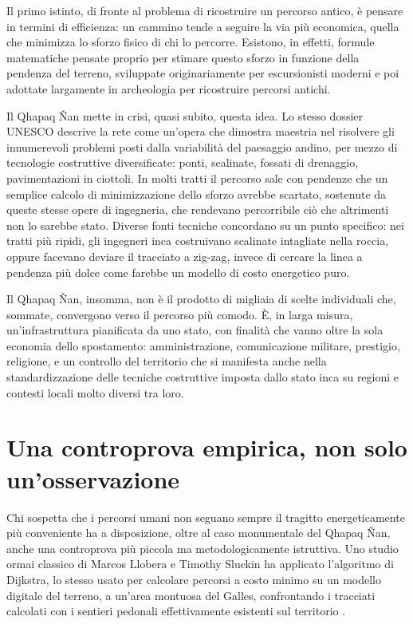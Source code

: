 Il primo istinto, di fronte al problema di ricostruire un percorso antico, è pensare in termini di efficienza: un cammino tende a seguire la via più economica, quella che minimizza lo sforzo fisico di chi lo percorre. Esistono, in effetti, formule matematiche pensate proprio per stimare questo sforzo in funzione della pendenza del terreno, sviluppate originariamente per escursionisti moderni e poi adottate largamente in archeologia per ricostruire percorsi antichi.

Il Qhapaq Ñan mette in crisi, quasi subito, questa idea. Lo stesso dossier UNESCO descrive la rete come un'opera che dimostra maestria nel risolvere gli innumerevoli problemi posti dalla variabilità del paesaggio andino, per mezzo di tecnologie costruttive diversificate: ponti, scalinate, fossati di drenaggio, pavimentazioni in ciottoli. In molti tratti il percorso sale con pendenze che un semplice calcolo di minimizzazione dello sforzo avrebbe scartato, sostenute da queste stesse opere di ingegneria, che rendevano percorribile ciò che altrimenti non lo sarebbe stato. Diverse fonti tecniche concordano su un punto specifico: nei tratti più ripidi, gli ingegneri inca costruivano scalinate intagliate nella roccia, oppure facevano deviare il tracciato a zig-zag, invece di cercare la linea a pendenza più dolce come farebbe un modello di costo energetico puro.

Il Qhapaq Ñan, insomma, non è il prodotto di migliaia di scelte individuali che, sommate, convergono verso il percorso più comodo. È, in larga misura, un'infrastruttura pianificata da uno stato, con finalità che vanno oltre la sola economia dello spostamento: amministrazione, comunicazione militare, prestigio, religione, e un controllo del territorio che si manifesta anche nella standardizzazione delle tecniche costruttive imposta dallo stato inca su regioni e contesti locali molto diversi tra loro.

\section{Una controprova empirica, non solo un'osservazione}

Chi sospetta che i percorsi umani non seguano sempre il tragitto energeticamente più conveniente ha a disposizione, oltre al caso monumentale del Qhapaq Ñan, anche una controprova più piccola ma metodologicamente istruttiva. Uno studio ormai classico di Marcos Llobera e Timothy Sluckin ha applicato l'algoritmo di Dijkstra, lo stesso usato per calcolare percorsi a costo minimo su un modello digitale del terreno, a un'area montuosa del Galles, confrontando i tracciati calcolati con i sentieri pedonali effettivamente esistenti sul territorio \citep{llobera2004}.

